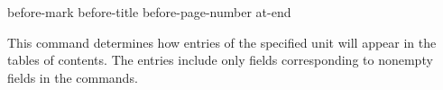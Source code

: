 
 {before-mark} {before-title} {before-page-number} {at-end}

This command determines how entries of the specified unit will appear in the
tables of contents. The entries include only fields corresponding to nonempty
fields in the \ConfigureToc commands. 
